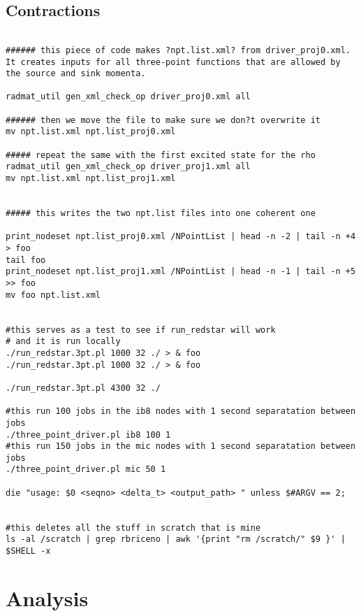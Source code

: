 \documentclass[prd,showpacs,showkeys,preprintnumbers,floatfix,
nofootinbib,superscriptaddress]{revtex4}
\begin{document}
\subsection{Contractions}


\footnotesize
\begin{verbatim}

###### this piece of code makes ?npt.list.xml? from driver_proj0.xml. It creates inputs for all three-point functions that are allowed by the source and sink momenta. 

radmat_util gen_xml_check_op driver_proj0.xml all

###### then we move the file to make sure we don?t overwrite it
mv npt.list.xml npt.list_proj0.xml

##### repeat the same with the first excited state for the rho
radmat_util gen_xml_check_op driver_proj1.xml all
mv npt.list.xml npt.list_proj1.xml


##### this writes the two npt.list files into one coherent one

print_nodeset npt.list_proj0.xml /NPointList | head -n -2 | tail -n +4 > foo
tail foo
print_nodeset npt.list_proj1.xml /NPointList | head -n -1 | tail -n +5 >> foo
mv foo npt.list.xml


#this serves as a test to see if run_redstar will work
# and it is run locally
./run_redstar.3pt.pl 1000 32 ./ > & foo
./run_redstar.3pt.pl 1000 32 ./ > & foo

./run_redstar.3pt.pl 4300 32 ./

#this run 100 jobs in the ib8 nodes with 1 second separatation between jobs
./three_point_driver.pl ib8 100 1
#this run 150 jobs in the mic nodes with 1 second separatation between jobs
./three_point_driver.pl mic 50 1

die "usage: $0 <seqno> <delta_t> <output_path> " unless $#ARGV == 2;


#this deletes all the stuff in scratch that is mine
ls -al /scratch | grep rbriceno | awk '{print "rm /scratch/" $9 }' | $SHELL -x
\end{verbatim} 
\normalsize


\section{Analysis}


 
\end{document}

